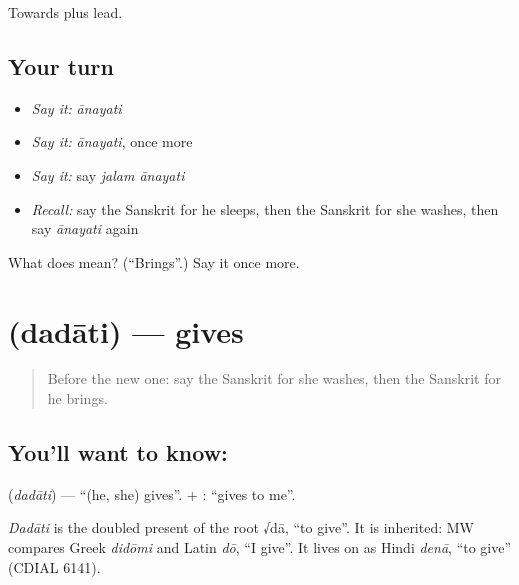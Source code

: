 \begin{grammarlens}[title={What you've built}]
Towards plus lead.
\end{grammarlens}

\subsection*{Your turn}
\begin{itemize}
\raggedright
  \item \emph{Say it:} \emph{ānayati}
  \item \emph{Say it:} \emph{ānayati}, once more
  \item \emph{Say it:} say \emph{jalam ānayati}
  \item \emph{Recall:} say the Sanskrit for he sleeps, then the Sanskrit for she washes, then say \emph{ānayati} again
\end{itemize}

\begin{tcolorbox}[breakable,colback=teal!4,colframe=teal!35!black,title={Before you move on}]
What does  mean? (\textquotedblleft{}Brings\textquotedblright{}.) Say it once more.
\end{tcolorbox}
\section[\texorpdfstring{\sk{ददाति} (dadāti)}{ददाति (dadāti)}]{ (dadāti) — gives}

\label{lesson:SA-C72-gives}



\begin{quote}
Before the new one: say the Sanskrit for she washes, then the Sanskrit for he brings.
\end{quote}

\subsection*{You'll want to know: }
\textbf{} (\emph{dadāti}) — \textquotedblleft{}(he, she) gives\textquotedblright{}. \textbf{} + \textbf{}: \textquotedblleft{}gives to me\textquotedblright{}.

\begin{cousinweb}
\emph{Dadāti} is the doubled present of the root √dā, \textquotedblleft{}to give\textquotedblright{}. It is inherited: MW compares Greek \emph{didōmi} and Latin \emph{dō}, \textquotedblleft{}I give\textquotedblright{}. It lives on as Hindi \emph{denā}, \textquotedblleft{}to give\textquotedblright{} (CDIAL 6141).
\end{cousinweb}

